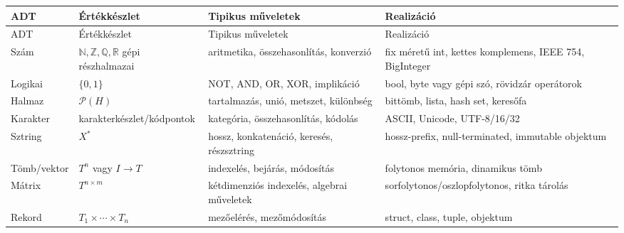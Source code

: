 \begingroup
\setlength{\tabcolsep}{4pt}
\begin{longtable}{L{0.17\textwidth}L{0.28\textwidth}L{0.25\textwidth}L{0.18\textwidth}}
\toprule
ADT & Értékkészlet & Tipikus műveletek & Realizáció \\
\midrule
\endfirsthead
\toprule
ADT & Értékkészlet & Tipikus műveletek & Realizáció \\
\midrule
\endhead
Szám & $\mathbb{N},\mathbb{Z},\mathbb{Q},\mathbb{R}$ gépi részhalmazai & aritmetika, összehasonlítás, konverzió & fix méretű int, kettes komplemens, IEEE 754, BigInteger \\
Logikai & $\{0,1\}$ & NOT, AND, OR, XOR, implikáció & bool, byte vagy gépi szó, rövidzár operátorok \\
Halmaz & $\mathcal{P}(H)$ & tartalmazás, unió, metszet, különbség & bittömb, lista, hash set, keresőfa \\
Karakter & karakterkészlet/kódpontok & kategória, összehasonlítás, kódolás & ASCII, Unicode, UTF-8/16/32 \\
Sztring & $X^*$ & hossz, konkatenáció, keresés, részsztring & hossz-prefix, null-terminated, immutable objektum \\
Tömb/vektor & $T^n$ vagy $I\to T$ & indexelés, bejárás, módosítás & folytonos memória, dinamikus tömb \\
Mátrix & $T^{n\times m}$ & kétdimenziós indexelés, algebrai műveletek & sorfolytonos/oszlopfolytonos, ritka tárolás \\
Rekord & $T_1\times\cdots\times T_n$ & mezőelérés, mezőmódosítás & struct, class, tuple, objektum \\
\bottomrule
\end{longtable}
\endgroup
